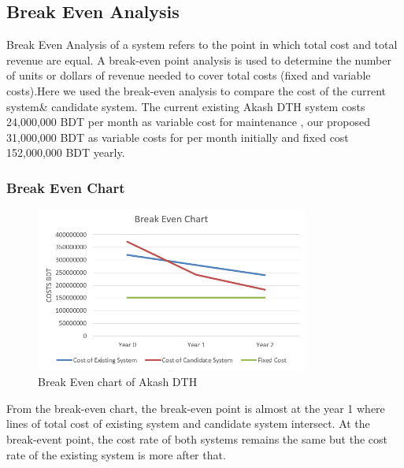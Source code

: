 \begin{spacing}{1}
\subsection {Break Even Analysis}
Break Even Analysis of a system refers to the point in which total cost and total revenue are equal. A break-even point analysis is used to determine the number of units or dollars of revenue needed to cover total costs (fixed and variable costs).Here we used the break-even analysis to compare the cost of the current system\& candidate system.
The current existing Akash DTH system costs 24,000,000 BDT per month as variable cost for maintenance , our proposed 31,000,000 BDT as variable costs for per month initially and fixed cost 152,000,000 BDT yearly.

\subsubsection {Break Even Chart}
\begin{figure}[H]
	\centering
	\includegraphics[width=0.8\textwidth]{break}
	\caption {Break Even chart of Akash DTH}
	\label{fig:break}
\end{figure}
From the break-even chart, the break-even point is almost at the year 1 where lines of total cost of existing system and candidate system intersect. At the break-event point, the cost rate of both systems remains the same but the cost rate of the existing system is more after that.



\end{spacing}
